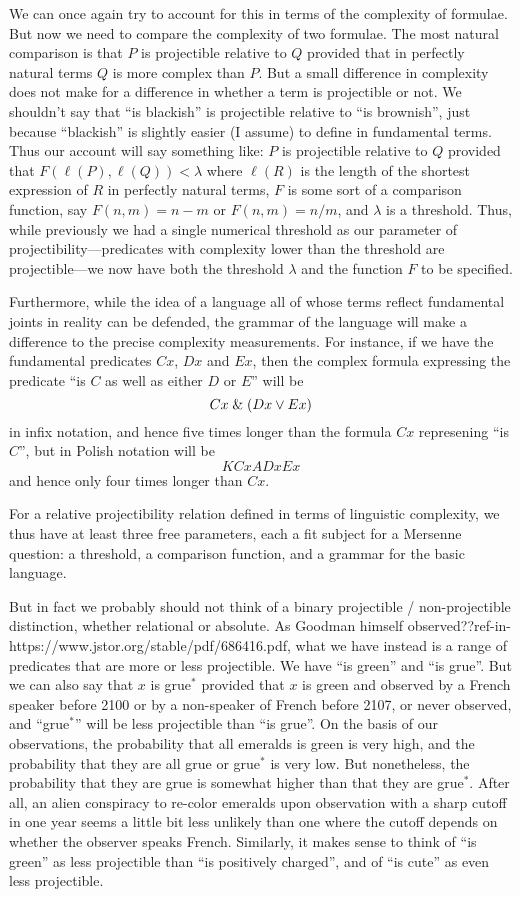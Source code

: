 We can once again try to account for this in terms of the complexity of formulae. But now we need to compare the complexity of
two formulae. The most natural comparison is that $P$ is projectible relative to $Q$ provided that in perfectly
natural terms $Q$ is more complex than $P$. But a small difference in complexity does not make for a difference
in whether a term is projectible or not. We shouldn't say that ``is blackish'' is projectible relative to 
``is brownish'', just because ``blackish'' is slightly easier (I assume) to define in fundamental terms. 
Thus our account will say something like: $P$ is projectible relative to $Q$ provided that 
$F(\ell(P),\ell(Q))<\lambda$ where $\ell(R)$ is the length of the shortest expression of $R$ in perfectly
natural terms, $F$ is some sort of a comparison function, say $F(n,m)=n-m$ or $F(n,m)=n/m$, and $\lambda$ is
a threshold. Thus, while previously we had a single numerical threshold 
as our parameter of projectibility---predicates with complexity lower than the threshold are projectible---we now have 
both the threshold $\lambda$ and the function $F$ to be specified.

Furthermore, while the idea of a language all of whose terms reflect fundamental joints in reality can be defended, the grammar
of the language will make a difference to the precise complexity measurements. For instance, if we have the fundamental predicates 
$Cx$, $Dx$ and $Ex$, then the complex formula expressing the predicate ``is $C$ as well as either $D$ or $E$'' will be 
$$
    Cx \mathrel{\&} (Dx \vee Ex)
$$    
    in infix notation, and hence five times longer than the formula $Cx$ represening ``is $C$'', but in Polish notation 
    will be 
$$
    KCxADxEx
$$    
and hence only four times longer than $Cx$.

For a relative projectibility relation defined in terms of linguistic complexity, we thus have at least three free parameters,
each a fit subject for a Mersenne question: a threshold, a comparison function, and a grammar for the basic language.

But in fact we probably should not think of a binary projectible / non-projectible distinction, whether
relational or absolute. As Goodman himself observed??ref-in-https://www.jstor.org/stable/pdf/686416.pdf, what we have instead is a range of predicates that are more or less projectible. We have ``is green'' and
``is grue''. But we can also say that $x$ is grue$^*$ provided that $x$ is green and observed by a French speaker before 2100 or by a 
non-speaker of French before 2107, or never observed, and ``grue$^*$'' will be less projectible than ``is grue''. On the basis of our observations, the
probability that all emeralds is green is very high, and the probability that they are all grue or grue$^*$ is very low. But
nonetheless, the probability that they are grue is somewhat higher than that they are grue$^*$. After all, an alien conspiracy to
re-color emeralds upon observation with a sharp cutoff in one year seems a little bit less unlikely than one where the cutoff 
depends on whether the observer speaks French. Similarly, it makes sense to think of ``is green'' as less projectible than ``is positively
charged'', and of ``is cute'' as even less projectible. 

